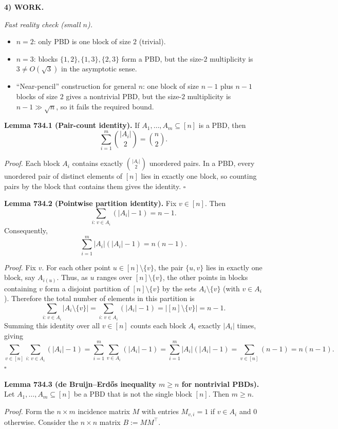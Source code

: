 \medskip
\noindent\textbf{4) WORK.}

\noindent\emph{Fast reality check (small $n$).}
\begin{itemize}
\item $n=2$: only PBD is one block of size $2$ (trivial).
\item $n=3$: blocks $\{1,2\},\{1,3\},\{2,3\}$ form a PBD, but the size-$2$ multiplicity is $3\not=O(\sqrt 3)$ in the asymptotic sense.
\item ``Near-pencil'' construction for general $n$: one block of size $n-1$ plus $n-1$ blocks of size $2$ gives a nontrivial PBD, but the size-$2$ multiplicity is $n-1\gg \sqrt n$, so it fails the required bound.
\end{itemize}

\medskip
\noindent\textbf{Lemma 734.1 (Pair-count identity).}
If $A_1,\dots,A_m\subseteq [n]$ is a PBD, then
\[
\sum_{i=1}^m \binom{|A_i|}{2}=\binom{n}{2}.
\]

\noindent\emph{Proof.}
Each block $A_i$ contains exactly $\binom{|A_i|}{2}$ unordered pairs. In a PBD, every unordered pair of distinct elements of $[n]$ lies in exactly one block, so counting pairs by the block that contains them gives the identity. \hfill $\square$

\medskip
\noindent\textbf{Lemma 734.2 (Pointwise partition identity).}
Fix $v\in[n]$. Then
\[
\sum_{i:\,v\in A_i} (|A_i|-1)=n-1.
\]
Consequently,
\[
\sum_{i=1}^m |A_i|(|A_i|-1)=n(n-1).
\]

\noindent\emph{Proof.}
Fix $v$. For each other point $u\in[n]\setminus\{v\}$, the pair $\{u,v\}$ lies in exactly one block, say $A_{i(u)}$. Thus, as $u$ ranges over $[n]\setminus\{v\}$, the other points in blocks containing $v$ form a disjoint partition of $[n]\setminus\{v\}$ by the sets $A_i\setminus\{v\}$ (with $v\in A_i$). Therefore the total number of elements in this partition is
\[
\sum_{i:\,v\in A_i} |A_i\setminus\{v\}|=\sum_{i:\,v\in A_i} (|A_i|-1)=|[n]\setminus\{v\}|=n-1.
\]
Summing this identity over all $v\in[n]$ counts each block $A_i$ exactly $|A_i|$ times, giving
\[
\sum_{v\in[n]}\sum_{i:\,v\in A_i} (|A_i|-1)=\sum_{i=1}^m \sum_{v\in A_i} (|A_i|-1)=\sum_{i=1}^m |A_i|(|A_i|-1)=\sum_{v\in[n]} (n-1)=n(n-1).
\]
\hfill $\square$

\medskip
\noindent\textbf{Lemma 734.3 (de Bruijn--Erd\H{o}s inequality $m\ge n$ for nontrivial PBDs).}
Let $A_1,\dots,A_m\subseteq[n]$ be a PBD that is not the single block $[n]$. Then $m\ge n$.

\noindent\emph{Proof.}
Form the $n\times m$ incidence matrix $M$ with entries $M_{v,i}=1$ if $v\in A_i$ and $0$ otherwise. Consider the $n\times n$ matrix $B:=MM^\top$.

